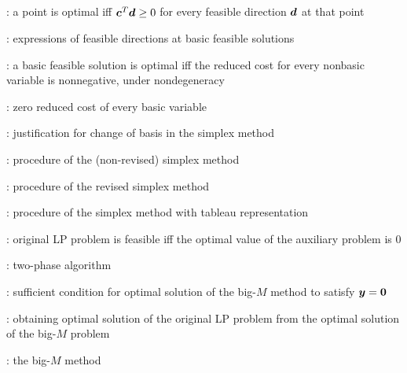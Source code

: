 \subsection*{}
\item {}: a point is optimal iff
\(\bm{c}^{T}\bm{d}\ge 0\) for every feasible direction \(\bm{d}\) at that
point
\item {}: expressions of feasible directions at basic feasible solutions
\item {}: a basic feasible solution is optimal iff the
reduced cost for every nonbasic variable is nonnegative, under nondegeneracy
\item {}: zero reduced cost of every basic variable
\item {}: justification for change of basis in the simplex method
\item {}: procedure of the (non-revised) simplex method
\item {}: procedure of the revised simplex method
\item {}: procedure of the simplex method with tableau representation
\item {}: original LP problem is feasible iff the optimal value of the auxiliary problem is \(0\)
\item {}: two-phase algorithm
\item {}: sufficient condition for optimal solution of the big-\(M\) method to satisfy \(\bm{y}=\bm{0}\)
\item {}: obtaining optimal solution of the original LP problem from the optimal solution of the big-\(M\) problem
\item {}: the big-\(M\) method
